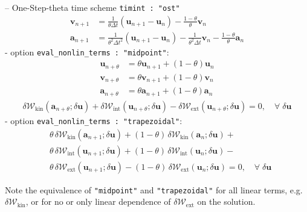 \documentclass[a4paper,12pt]{report}
\newcommand{\bs}[1]{\boldsymbol{#1}}
\begin{document}
-- One-Step-theta time scheme \verb.timint : "ost".\\

\begin{equation}
\begin{aligned}
\bs{v}_{n+1} &= \frac{1}{\theta\Delta t}(\bs{u}_{n+1}-\bs{u}_{n}) - \frac{1-\theta}{\theta} \bs{v}_{n} \\
\bs{a}_{n+1} &= \frac{1}{\theta^2\Delta t^2}(\bs{u}_{n+1}-\bs{u}_{n}) - \frac{1}{\theta^2\Delta t} \bs{v}_{n} - \frac{1-\theta}{\theta}\bs{a}_{n}
\end{aligned}
\end{equation}
\quad - option \verb.eval_nonlin_terms : "midpoint".:
\begin{equation}
\label{equation-solid-midpoint-ost}
\begin{aligned}
\bs{u}_{n+\theta} &= \theta \bs{u}_{n+1} + (1-\theta) \bs{u}_{n} \\
\bs{v}_{n+\theta} &= \theta \bs{v}_{n+1} + (1-\theta) \bs{v}_{n} \\
\bs{a}_{n+\theta} &= \theta \bs{a}_{n+1} + (1-\theta) \bs{a}_{n}
\end{aligned}
\end{equation}
\begin{equation}
\begin{aligned}
\delta \mathcal{W}_{\mathrm{kin}}(\bs{a}_{n+\theta};\delta\bs{u}) + \delta \mathcal{W}_{\mathrm{int}}(\bs{u}_{n+\theta};\delta\bs{u}) - \delta \mathcal{W}_{\mathrm{ext}}(\bs{u}_{n+\theta};\delta\bs{u}) = 0, \quad \forall \; \delta\bs{u}\end{aligned}
\end{equation}
\quad - option \verb.eval_nonlin_terms : "trapezoidal".:
\begin{equation}
\begin{aligned}
&\theta\,\delta \mathcal{W}_{\mathrm{kin}}(\bs{a}_{n+1};\delta\bs{u}) + (1-\theta)\,\delta \mathcal{W}_{\mathrm{kin}}(\bs{a}_{n};\delta\bs{u}) + \\
& \theta\,\delta \mathcal{W}_{\mathrm{int}}(\bs{u}_{n+1};\delta\bs{u}) + (1-\theta)\,\delta \mathcal{W}_{\mathrm{int}}(\bs{u}_{n};\delta\bs{u}) - \\
& \theta\,\delta \mathcal{W}_{\mathrm{ext}}(\bs{u}_{n+1};\delta\bs{u}) - (1-\theta)\,\delta \mathcal{W}_{\mathrm{ext}}(\bs{u}_{n};\delta\bs{u}) = 0, \quad \forall \; \delta\bs{u}
\end{aligned}
\end{equation}

Note the equivalence of \verb."midpoint". and \verb."trapezoidal". for all linear terms, e.g. $\delta \mathcal{W}_{\mathrm{kin}}$, or for no or only linear dependence of $\delta \mathcal{W}_{\mathrm{ext}}$ on the solution.\\
\end{document}

